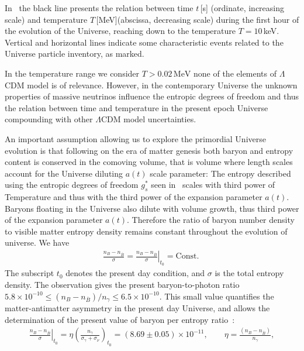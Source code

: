 In~ the black line presents the relation between time $t$\,[s] (ordinate, increasing scale) and temperature $T$\,[MeV](abscissa, decreasing scale)  during the first hour of the evolution of the Universe, reaching down to the temperature $T=10$\,keV. Vertical and horizontal lines indicate some characteristic events related to the Universe particle inventory, as marked. 

In the temperature range we consider $T>0.02\,\mathrm{MeV}$  none of the elements of $\Lambda$CDM model is of relevance. However, in the contemporary Universe the unknown properties of massive neutrinos influence the entropic degrees of freedom and thus the relation between time and temperature in the present epoch Universe compounding with other $\Lambda$CDM model uncertainties.


An important assumption allowing us to explore the primordial Universe evolution is that following on the era of matter genesis both baryon and entropy content is conserved in the comoving volume, that is volume where length scales account for the Universe diluting   $a(t)$  scale parameter: The entropy described using the entropic degrees of freedom $g^\ast_s$ seen in~  scales with third power of Temperature and thus with  the third power of the expansion parameter $a(t)$.  Baryons floating in the Universe also dilute with volume growth, thus third power of the expansion parameter $a(t)$. Therefore the ratio of baryon number density to visible matter entropy density remains constant throughout the evolution of universe. We have
\begin{align}
\frac{n_B-n_{\overline{B}}}{\sigma}= \left.\frac{n_B-n_{\overline{B}}}{ \sigma}\right|_{t_0}=\mathrm{Const.}\;
\end{align}
The subscript $t_0$ denotes the present day condition, and $\sigma$ is the total entropy density.
The observation gives the present baryon-to-photon ratio ~\cite{ParticleDataGroup:2022pth} $5.8 \times 10^{-10} \leqslant(n_B-n_{\overline{B}})/n_\gamma\leqslant6.5\times10^{-10}$. This small value quantifies the matter-antimatter asymmetry in the present day Universe, and allows the determination of the present value of baryon per entropy ratio~\cite{Rafelski:2019twp,Fromerth:2002wb,Fromerth:2012fe}:
\begin{align}\label{BaryonEntropyRatio}
\left.\frac{n_B-n_{\overline{B}}}{ \sigma}\right|_{t_0}=\eta\left(\frac{n_\gamma}{\sigma_\gamma+\sigma_\nu}\right)_{\!t_0}\!\!\!\!=(8.69\pm0.05)\!\!\times\!\!10^{-11},\qquad \eta=\frac{(n_B-n_{\overline{B}})}{n_\gamma},
\end{align}
